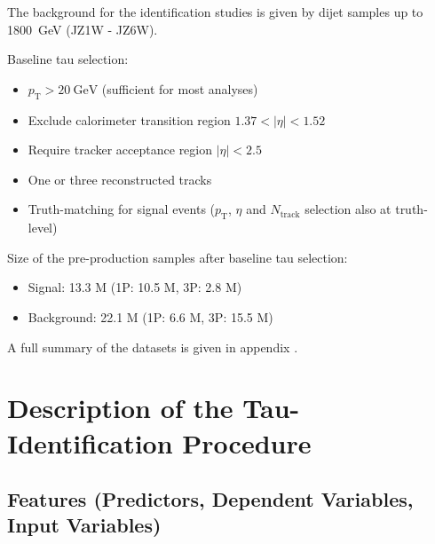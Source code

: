  The background for the identification studies is given by
dijet samples up to \SI{1800}{\giga\electronvolt} (JZ1W - JZ6W). 

Baseline tau selection:
\begin{itemize}
\item $p_\text{T} > \SI{20}{\giga\electronvolt}$ (sufficient for most analyses)
\item Exclude calorimeter transition region $1.37 < |\eta| < 1.52$
\item Require tracker acceptance region $|\eta| < 2.5$
\item One or three reconstructed tracks
\item Truth-matching for signal events ($p_\text{T}$, $\eta$ and
  $N_\text{track}$ selection also at truth-level)
\end{itemize}

Size of the pre-production samples after baseline tau selection:
\begin{itemize}
\item Signal: 13.3 M (1P: 10.5 M, 3P: 2.8 M)
\item Background: 22.1 M (1P: 6.6 M, 3P: 15.5 M)
\end{itemize}



A full summary of the datasets is given in appendix .

\section{Description of the Tau-Identification Procedure}
\label{sec:bdt_tauid}

\subsection{Features (Predictors, Dependent Variables, Input Variables)}
\label{sec:bdt_features}


